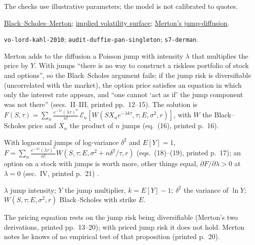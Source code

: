 \begin{qfmodel}
 The checks use illustrative parameters; the model is not calibrated to quotes.


 \hyperref[mod:black-scholes-merton]{Black--Scholes--Merton}; \hyperref[def:implied-volatility-surface]{implied volatility surface}; \hyperref[mod:merton-jump-diffusion]{Merton's jump-diffusion}.

 \nolinkurl{vo-lord-kahl-2010}; \nolinkurl{audit-duffie-pan-singleton}; \nolinkurl{s7-derman}.

\end{qfmodel}

\begin{qfmodel}\label{mod:merton-jump-diffusion}
 Merton adds to the diffusion a Poisson jump with intensity $\lambda$ that multiplies the price by $Y$. With jumps ``there is no way to construct a riskless portfolio of stock and options'', so the Black--Scholes argument fails; if the jump risk is diversifiable (uncorrelated with the market), the option price satisfies an equation in which only the interest rate appears, and ``one cannot `act as if' the jump component was not there'' (secs.~II--III, printed pp.~12--15). The solution is $F(S,\tau)=\sum_n\frac{e^{-\lambda\tau}(\lambda\tau)^n}{n!}\,\mathcal E_n[W(SX_ne^{-\lambda k\tau},\tau;E,\sigma^2,r)]$, with $W$ the Black--Scholes price and $X_n$ the product of $n$ jumps (eq.~(16), printed p.~16).

With lognormal jumps of log-variance $\delta^2$ and $E[Y]=1$, $F=\sum_n\frac{e^{-\lambda\tau}(\lambda\tau)^n}{n!}W(S,\tau;E,\sigma^2+n\delta^2/\tau,r)$ (eqs.~(18)--(19), printed p.~17); an option on a stock with jumps is worth more, other things equal, $\partial F/\partial\lambda>0$ at $\lambda=0$ (sec.~IV, printed p.~21) \citep[Sloan Working Paper 787-75, 1975, printed pp.~12--21]{wide-merton-jumps}.

 $\lambda$ jump intensity; $Y$ the jump multiplier, $k=E[Y]-1$; $\delta^2$ the variance of $\ln Y$; $W(S,\tau;E,\sigma^2,r)$ Black--Scholes with strike $E$.

 The pricing equation rests on the jump risk being diversifiable (Merton's two derivations, printed pp.~13--20); with priced jump risk it does not hold. Merton notes he knows of no empirical test of that proposition (printed p.~20).


\end{qfmodel}
